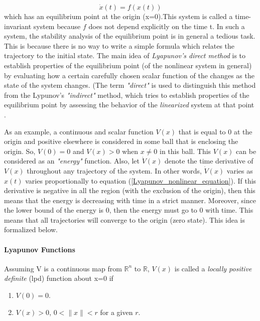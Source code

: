 \documentclass{thesisreport}
\begin{document}
\begin{equation} \label{Lyapunov_nonlinear_equation}
\dot{x}(t) = f(x(t))
\end{equation}
which has an equilibrium point at the origin (x=0).This system is called a time-invariant system because $f$ does not depend explicitly on the time t. In such a system, the stability analysis of the equilibrium point is in general a tedious task. This is because there is no way to write a simple formula which relates the trajectory to the initial state. The main idea of \textit{Lyapunov's direct method} is to establish properties of the equilibrium point (of the nonlinear system in general) by evaluating how a certain carefully chosen scalar function of the changes as the state of the system changes. (The term \textit{"direct"} is used to distinguish this method from the Lypunov's \textit{"indirect"} method, which tries to establish properties of the equilibrium point by assessing the behavior of the \textit{linearized} system at that point \cite{MELCHORAGUILAR2004175}.

As an example, a continuous and scalar function $V(x)$ that is equal to 0 at the origin and positive elsewhere is considered in some ball that is enclosing the origin. So, $V(0)=0$ and $V(x)>0$ when $x \neq 0$ in this ball. This $V(x)$ can be considered as an \textit{"energy"} function. Also, let $\dot{V}(x)$ denote the time derivative of $V(x)$ throughout any trajectory of the system. In other words,  $\dot{V}(x)$ varies as $x(t)$ varies proportionally to equation (\ref{Lyapunov_nonlinear_equation}). If this derivative is negative in all the region (with the exclusion of the origin), then this means that the energy is decreasing with time in a strict manner. Moreover, since the lower bound of the energy is 0, then the energy must go to 0 with time. This means that all trajectories will converge to the origin (zero state). This idea is formalized below.




\newpage

\paragraph{Lyapunov Functions}

Assuming V is a continuous map from $\mathbb{R}^n$ to $\mathbb{R}$, $V(x)$ is called a \textit{locally positive definite} (lpd) function about x=0 if 

\begin{enumerate}
	\item $V(0)=0$.
	\item $V(x)>0$, $0<\|x\|<r$ for a given $r$.
\end{enumerate}
\end{document}
